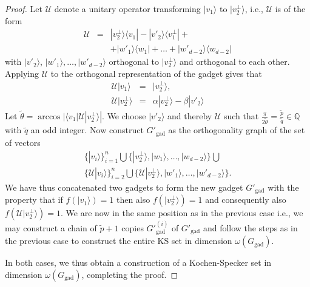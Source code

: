\documentclass[twocolumn, a4paper, superscriptaddress,nofootinbib, accepted=2020-08-07, hyperref]{quantumarticle}
\begin{document}
\begin{proof}
	Let $\mathcal{U}$ denote a unitary operator transforming $|v_1 \rangle$ to $|v_2^{\perp} \rangle$, i.e., $\mathcal{U}$ is of the form 
	\begin{eqnarray}
	\mathcal{U} &=& |v_2^{\perp} \rangle \langle v_1| - | v'_2 \rangle \langle v_1^{\perp}| +  \nonumber \\
&&+  |w'_1 \rangle \langle w_1 |+\dots+ |w'_{d-2} \rangle \langle w_{d-2} | 
	\end{eqnarray}
	with $|v'_2\rangle$, $|w'_1\rangle,\ldots,|w'_{d-2}\rangle$ orthogonal to $|v_2^{\perp} \rangle$ and orthogonal to each other.	%
	Applying $\mathcal{U}$ to the orthogonal representation of the gadget gives that 
	\begin{eqnarray}
	\mathcal{U} | v_1 \rangle &=& | v_2^{\perp} \rangle, \nonumber \\
	\mathcal{U} | v_2^{\perp} \rangle &=& \alpha |v_2^{\perp} \rangle - \beta |v'_2 \rangle
	\end{eqnarray} 
	Let $\tilde{\theta} = \arccos| \langle v_1 | \mathcal{U} | v_2^{\perp} \rangle |$.
	We choose $|v'_2\rangle$ and thereby $\mathcal{U}$ such that $\frac{\pi}{2 \tilde{\theta}} = \frac{\tilde{p}}{\tilde{q}} \in \mathbb{Q}$ with $\tilde{q}$ an odd integer.  Now construct $G'_{\text{gad}}$ as the orthogonality graph of the set of vectors 
	\begin{eqnarray}
	\{|v_i \rangle\}_{i=1}^{n} \bigcup \{|v_2^{\perp} \rangle, |w_1 \rangle, \dots, |w_{d-2}\rangle\} \bigcup \nonumber \\ \{\mathcal{U}|v_i \rangle\}_{i=2}^{n} \bigcup \{\mathcal{U} |v_2^{\perp} \rangle, |w'_1 \rangle, \dots, |w'_{d-2} \rangle\}.
	\end{eqnarray}  
	We have thus concatenated two gadgets to form the new gadget $G'_{\text{gad}}$ with the property that if $f(|v_1 \rangle) = 1$ then also $f(|v_2^{\perp} \rangle) = 1$ and consequently also $f(\mathcal{U} | v_2^{\perp} \rangle) = 1$. We are now in the same position as in the previous case i.e., we may construct a chain of $\tilde{p}+1$ copies $G'^{(i)}_{\text{gad}}$ of $G'_{\text{gad}}$ and follow the steps as in the previous case to construct the entire KS set in dimension $\omega(G_{\text{gad}})$.

In both cases, we thus obtain a construction of a Kochen-Specker set in dimension $\omega(G_{\text{gad}})$, completing the proof. 
\end{proof}
\end{document}
